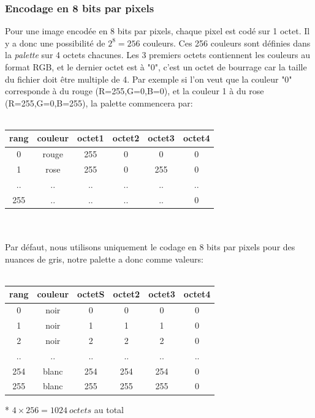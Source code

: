 \documentclass{article}
\begin{document}
			\subsubsection{Encodage en 8 bits par pixels}
			Pour une image encodée en 8 bits par pixels, chaque pixel est codé sur 1 octet. Il y a donc une possibilité de \begin{math}2^8 = 256\end{math} couleurs. Ces 256 couleurs sont définies dans la \emph{palette} sur 4 octets chacunes. Les 3 premiers octets contiennent les couleurs au format RGB, et le dernier octet est à "0", c'est un octet de bourrage car la taille du fichier doit être multiple de 4. Par exemple si l'on veut que la couleur "0" corresponde à du rouge (R=255,G=0,B=0), et la couleur 1 à du rose (R=255,G=0,B=255), la palette commencera par: \\\\
			\begin{tabular}{|c|c|c|c|c|c|}
				\hline
				\textbf{rang}&\textbf{couleur}&\textbf{octet1}&\textbf{octet2}&\textbf{octet3}&\textbf{octet4}\\\hline
				0   & rouge & 255 & 0  & 0   & 0\\\hline
				1   & rose  & 255 & 0  & 255 & 0\\\hline
				..  & ..    & ..  & .. & ..  & ..\\\hline
				255 & ..    & ..  & .. & ..  & 0\\\hline
			\end{tabular}\\\\
			Par défaut, nous utilisons uniquement le codage en 8 bits par pixels pour des nuances de gris, notre palette a donc comme valeurs:\\\\
			\begin{tabular}{|c|c|c|c|c|c|}
				\hline
				\textbf{rang}&\textbf{couleur}&\textbf{octetS}&\textbf{octet2}&\textbf{octet3}&\textbf{octet4}\\\hline
				0   & noir  & 0   & 0   & 0   & 0\\\hline
				1   & noir  & 1   & 1   & 1   & 0\\\hline
				2   & noir  & 2   & 2   & 2   & 0\\\hline
				..  & ..    & ..  & ..  & ..  & ..\\\hline
				254 & blanc & 254 & 254 & 254 & 0\\\hline
				255 & blanc & 255 & 255 & 255 & 0\\\hline
			\end{tabular} * \begin{math}4\times256 = 1024\ octets\end{math} au total
	
\end{document}
